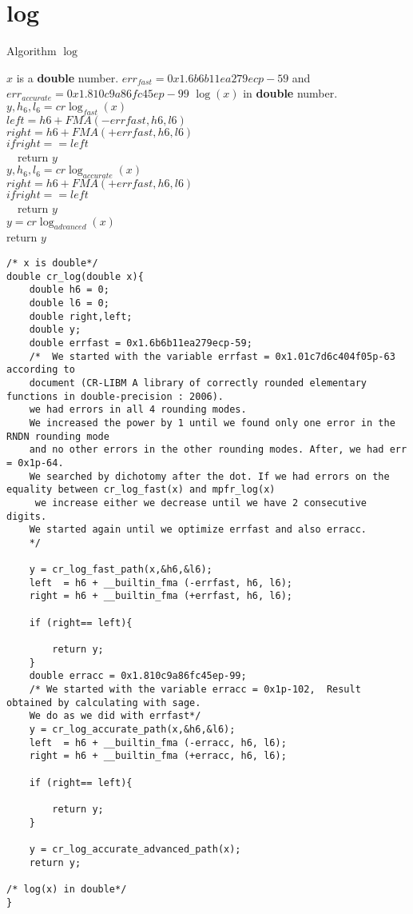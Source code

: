 \section*{log}
\begin{algorithm}[htbp]
  \caption{Algorithm $\log$}
\begin{algorithmic}[1]
\Condition $x$ is a \textbf{double} number.
\Condition $err_{fast} = 0x1.6b6b11ea279ecp-59$ and $err_{accurate} = 0x1.810c9a86fc45ep-99$
\Output $\log(x)$ in \textbf{double} number.
\State $y,h_6,l_6 = cr\log_{fast}(x)$\\
$left  = h6 + FMA(-errfast, h6, l6)$\\
$right = h6 + FMA(+errfast, h6, l6)$\\
$if right== left$\\
\ \ return $y$\\
$y,h_6,l_6 = cr\log_{accurate}(x)$\\
$right = h6 + FMA(+errfast, h6, l6)$\\
$if right== left$\\
\ \ return $y$\\
$y = cr\log_{advanced}(x)$\\
return $y$
\end{algorithmic}
\label{algo:log}
\end{algorithm}

\begin{lstlisting}
/* x is double*/
double cr_log(double x){
    double h6 = 0;
    double l6 = 0;
    double right,left;
    double y;
    double errfast = 0x1.6b6b11ea279ecp-59;
    /*  We started with the variable errfast = 0x1.01c7d6c404f05p-63 according to
    document (CR-LIBM A library of correctly rounded elementary functions in double-precision : 2006).
    we had errors in all 4 rounding modes.
    We increased the power by 1 until we found only one error in the RNDN rounding mode 
    and no other errors in the other rounding modes. After, we had err = 0x1p-64.
    We searched by dichotomy after the dot. If we had errors on the equality between cr_log_fast(x) and mpfr_log(x)
     we increase either we decrease until we have 2 consecutive digits.
    We started again until we optimize errfast and also erracc.
    */
    
    y = cr_log_fast_path(x,&h6,&l6);
    left  = h6 + __builtin_fma (-errfast, h6, l6);
    right = h6 + __builtin_fma (+errfast, h6, l6);
    
    if (right== left){
        
        return y;
    }
    double erracc = 0x1.810c9a86fc45ep-99;
    /* We started with the variable erracc = 0x1p-102,  Result obtained by calculating with sage.
    We do as we did with errfast*/
    y = cr_log_accurate_path(x,&h6,&l6);
    left  = h6 + __builtin_fma (-erracc, h6, l6);
    right = h6 + __builtin_fma (+erracc, h6, l6);
    
    if (right== left){
       
        return y;
    }

    y = cr_log_accurate_advanced_path(x);
    return y;

/* log(x) in double*/
}
\end{lstlisting}
